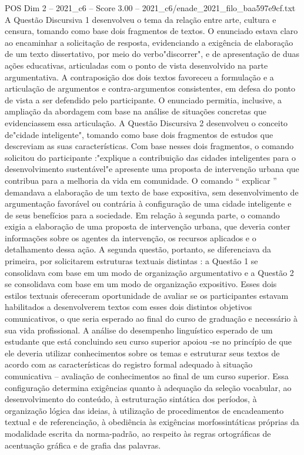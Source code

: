 \begin{textsample}{POS Dim 2 – 2021\_c6 – Score 3.00 – 2021\_c6/enade\_2021\_filo\_baa597e9cf.txt}
A Questão Discursiva 1 desenvolveu o tema da relação entre arte, cultura e censura, tomando como base dois fragmentos de textos.
O enunciado estava claro ao encaminhar a solicitação de resposta, evidenciando a exigência de elaboração de um texto dissertativo, por meio do verbo"discorrer", e de apresentação de duas ações educativas, articuladas com o ponto de vista desenvolvido na parte argumentativa.
A contraposição dos dois textos favoreceu a formulação e a articulação de argumentos e contra-argumentos consistentes, em defesa do ponto de vista a ser defendido pelo participante.
O enunciado permitia, inclusive, a ampliação da abordagem com base na análise de situações concretas que evidenciassem essa articulação.
A Questão Discursiva 2 desenvolveu o conceito de"cidade inteligente", tomando como base dois fragmentos de estudos que descreviam as suas características.
Com base nesses dois fragmentos, o comando solicitou do participante :"explique a contribuição das cidades inteligentes para o desenvolvimento sustentável"e apresente uma proposta de intervenção urbana que contribua para a melhoria da vida em comunidade.
O comando “ explicar ” demandava a elaboração de um texto de base expositiva, sem desenvolvimento de argumentação favorável ou contrária à configuração de uma cidade inteligente e de seus benefícios para a sociedade.
Em relação à segunda parte, o comando exigia a elaboração de uma proposta de intervenção urbana, que deveria conter informações sobre os agentes da intervenção, os recursos aplicados e o detalhamento dessa ação.
A segunda questão, portanto, se diferenciava da primeira, por solicitarem estruturas textuais distintas : a Questão 1 se consolidava com base em um modo de organização argumentativo e a Questão 2 se consolidava com base em um modo de organização expositivo.
Esses dois estilos textuais ofereceram oportunidade de avaliar se os participantes estavam habilitados a desenvolverem textos com esses dois distintos objetivos comunicativos, o que seria esperado ao final do curso de graduação e necessário à sua vida profissional.
A análise do desempenho linguístico esperado de um estudante que está concluindo seu curso superior apoiou -se no princípio de que ele deveria utilizar conhecimentos sobre os temas e estruturar seus textos de acordo com as características do registro formal adequado à situação comunicativa – avaliação de conhecimentos ao final de um curso superior.
Essa configuração determina exigências quanto à adequação da seleção vocabular, ao desenvolvimento do conteúdo, à estruturação sintática dos períodos, à organização lógica das ideias, à utilização de procedimentos de encadeamento textual e de referenciação, à obediência às exigências morfossintáticas próprias da modalidade escrita da norma-padrão, ao respeito às regras ortográficas de acentuação gráfica e de grafia das palavras.

\end{textsample}
